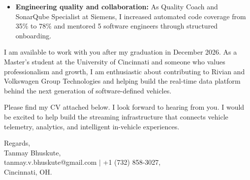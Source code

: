 \documentclass[11pt]{letter}
\begin{document}
\begin{letter}{}
\begin{itemize}[leftmargin=*, itemsep=0.45em]
    \item \textbf{Engineering quality and collaboration:} As Quality Coach and SonarQube Specialist at Siemens, I increased automated code coverage from 35\% to 78\% and mentored 5 software engineers through structured onboarding.
\end{itemize}

I am available to work with you after my graduation in December 2026. As a Master's student at the University of Cincinnati and someone who values professionalism and growth, I am enthusiastic about contributing to Rivian and Volkswagen Group Technologies and helping build the real-time data platform behind the next generation of software-defined vehicles.

Please find my CV attached below. I look forward to hearing from you. I would be excited to help build the streaming infrastructure that connects vehicle telemetry, analytics, and intelligent in-vehicle experiences.

{\setlength{\parskip}{0pt}
Regards,\\
Tanmay Bhuskute,\\
tanmay.v.bhuskute@gmail.com $\mid$ +1 (732) 858-3027,\\
Cincinnati, OH.
}

\end{letter}
\end{document}
